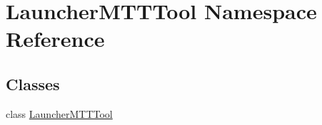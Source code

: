 \hypertarget{namespaceLauncherMTTTool}{\section{Launcher\-M\-T\-T\-Tool Namespace Reference}
\label{namespaceLauncherMTTTool}
}
\subsection*{Classes}
\begin{DoxyCompactItemize}
\item 
class \hyperlink{classLauncherMTTTool_1_1LauncherMTTTool}{Launcher\-M\-T\-T\-Tool}
\end{DoxyCompactItemize}
